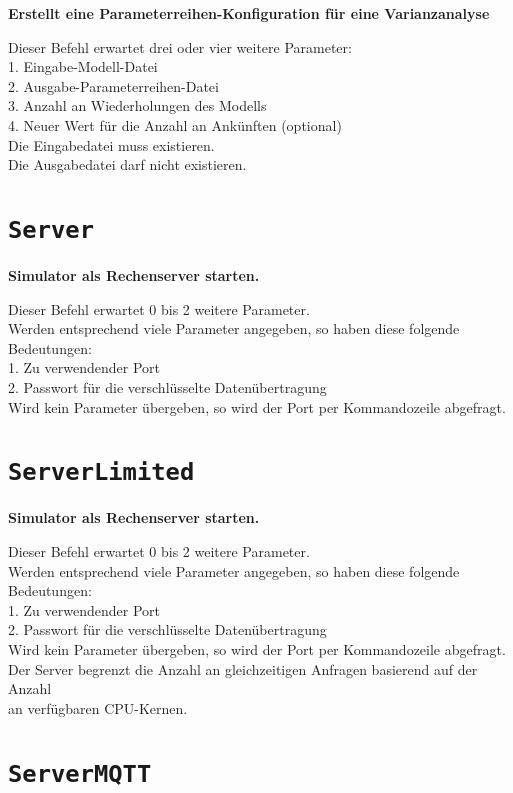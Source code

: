 \textbf{Erstellt eine Parameterreihen-Konfiguration für eine Varianzanalyse}

Dieser Befehl erwartet drei oder vier weitere Parameter:\\
1. Eingabe-Modell-Datei\\
2. Ausgabe-Parameterreihen-Datei\\
3. Anzahl an Wiederholungen des Modells\\
4. Neuer Wert für die Anzahl an Ankünften (optional)\\
Die Eingabedatei muss existieren.\\
Die Ausgabedatei darf nicht existieren.

\section{\texttt{Server}}

\textbf{Simulator als Rechenserver starten.}

Dieser Befehl erwartet 0 bis 2 weitere Parameter.\\
Werden entsprechend viele Parameter angegeben, so haben diese folgende Bedeutungen:\\
1. Zu verwendender Port\\
2. Passwort für die verschlüsselte Datenübertragung\\
Wird kein Parameter übergeben, so wird der Port per Kommandozeile abgefragt.

\section{\texttt{ServerLimited}}

\textbf{Simulator als Rechenserver starten.}

Dieser Befehl erwartet 0 bis 2 weitere Parameter.\\
Werden entsprechend viele Parameter angegeben, so haben diese folgende Bedeutungen:\\
1. Zu verwendender Port\\
2. Passwort für die verschlüsselte Datenübertragung\\
Wird kein Parameter übergeben, so wird der Port per Kommandozeile abgefragt.\\
Der Server begrenzt die Anzahl an gleichzeitigen Anfragen basierend auf der Anzahl\\
an verfügbaren CPU-Kernen.

\section{\texttt{ServerMQTT}}

